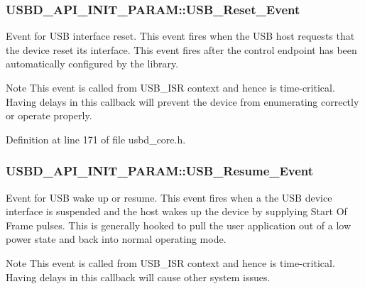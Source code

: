 \subsubsection[{\texorpdfstring{U\+S\+B\+\_\+\+Reset\+\_\+\+Event}{USB_Reset_Event}}]{ U\+S\+B\+D\+\_\+\+A\+P\+I\+\_\+\+I\+N\+I\+T\+\_\+\+P\+A\+R\+A\+M\+::\+U\+S\+B\+\_\+\+Reset\+\_\+\+Event}\hypertarget{structUSBD__API__INIT__PARAM_a49f0d2a8b163486e07cfea83b436234f}{}\label{structUSBD__API__INIT__PARAM_a49f0d2a8b163486e07cfea83b436234f}
Event for U\+SB interface reset. This event fires when the U\+SB host requests that the device reset its interface. This event fires after the control endpoint has been automatically configured by the library. ~\newline
\begin{DoxyNote}{Note}
This event is called from U\+S\+B\+\_\+\+I\+SR context and hence is time-\/critical. Having delays in this callback will prevent the device from enumerating correctly or operate properly. 
\end{DoxyNote}


Definition at line 171 of file usbd\+\_\+core.\+h.

\subsubsection[{\texorpdfstring{U\+S\+B\+\_\+\+Resume\+\_\+\+Event}{USB_Resume_Event}}]{ U\+S\+B\+D\+\_\+\+A\+P\+I\+\_\+\+I\+N\+I\+T\+\_\+\+P\+A\+R\+A\+M\+::\+U\+S\+B\+\_\+\+Resume\+\_\+\+Event}\hypertarget{structUSBD__API__INIT__PARAM_a2fb170236fa92a20f29dc8c13b24a1d1}{}\label{structUSBD__API__INIT__PARAM_a2fb170236fa92a20f29dc8c13b24a1d1}
Event for U\+SB wake up or resume. This event fires when a the U\+SB device interface is suspended and the host wakes up the device by supplying Start Of Frame pulses. This is generally hooked to pull the user application out of a low power state and back into normal operating mode. ~\newline
\begin{DoxyNote}{Note}
This event is called from U\+S\+B\+\_\+\+I\+SR context and hence is time-\/critical. Having delays in this callback will cause other system issues. 
\end{DoxyNote}



